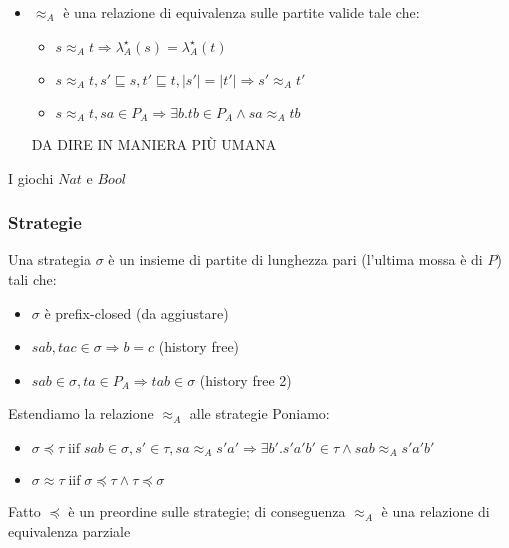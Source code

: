 \documentclass{beamer}
\begin{document}
\begin{frame}
	
	\begin{itemize}
	\item $\approx_A$ è una relazione di equivalenza sulle partite valide tale che:
		\begin{itemize}
		\item $s\approx_A t \Rightarrow \lambda^\star _A (s) = \lambda^\star _A (t) $
		\item $s\approx_A t , s' \sqsubseteq s , t' \sqsubseteq t, |s'| = |t'| \Rightarrow s' \approx_A t'$
		\item $s\approx_A t , sa\in P_A \Rightarrow \exists b . tb \in P_A \wedge sa \approx_A tb$
		\end{itemize}
	DA DIRE IN MANIERA PIÙ UMANA
	\end{itemize}
	
	\begin{example}
		I giochi $Nat$ e $Bool$
	\end{example}	
	
\end{frame}

\begin{frame}

	\frametitle{Strategie}
	
	Una strategia $\sigma$ è un insieme di partite di lunghezza pari (l'ultima mossa è di $P$) tali che:
	\begin{itemize}
	\item $\sigma$ è prefix-closed (da aggiustare)
	\item $sab , tac \in \sigma \Rightarrow b=c$ (history free)
	\item $sab\in \sigma, ta\in P_A \Rightarrow tab\in \sigma$ (history free 2)
	\end{itemize}
	
	Estendiamo la relazione $\approx_A$ alle strategie
	Poniamo:
	\begin{itemize}
	\item $\sigma \preccurlyeq \tau \; \text{iif} \; sab\in \sigma , s' \in \tau , sa \approx_A s'a' \Rightarrow \exists b' . s'a'b' \in \tau \wedge sab \approx_A s'a'b'$
	\item $\sigma \approx \tau \; \text{iif} \; \sigma \preccurlyeq \tau \wedge \tau \preccurlyeq \sigma$
	\end{itemize}

	\begin{block}{Fatto}
		$\preccurlyeq$ è un preordine sulle strategie; di conseguenza $\approx_A$ è una relazione di equivalenza parziale
	\end{block}
	
\end{frame}
\end{document}
